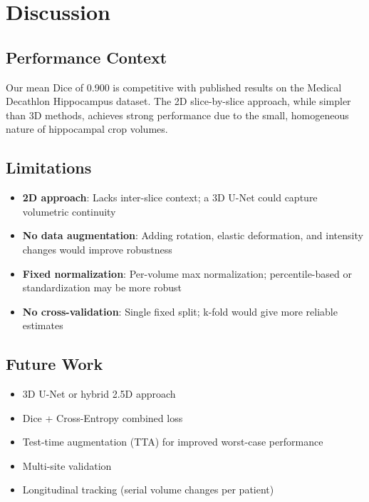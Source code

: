 \documentclass[12pt,a4paper,twocolumn]{article}
\begin{document}
\section{Discussion}

\subsection{Performance Context}
Our mean Dice of 0.900 is competitive with published results on the Medical Decathlon Hippocampus dataset. The 2D slice-by-slice approach, while simpler than 3D methods, achieves strong performance due to the small, homogeneous nature of hippocampal crop volumes.

\subsection{Limitations}
\begin{itemize}[nosep]
    \item \textbf{2D approach}: Lacks inter-slice context; a 3D U-Net could capture volumetric continuity
    \item \textbf{No data augmentation}: Adding rotation, elastic deformation, and intensity changes would improve robustness
    \item \textbf{Fixed normalization}: Per-volume max normalization; percentile-based or standardization may be more robust
    \item \textbf{No cross-validation}: Single fixed split; k-fold would give more reliable estimates
\end{itemize}

\subsection{Future Work}
\begin{itemize}[nosep]
    \item 3D U-Net or hybrid 2.5D approach
    \item Dice + Cross-Entropy combined loss
    \item Test-time augmentation (TTA) for improved worst-case performance
    \item Multi-site validation
    \item Longitudinal tracking (serial volume changes per patient)
\end{itemize}
\end{document}
